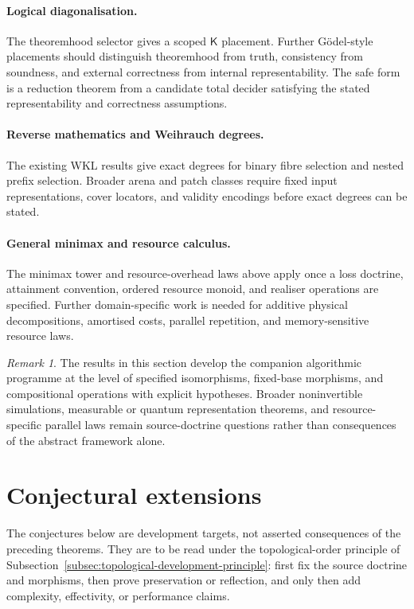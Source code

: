 \documentclass[11pt]{article}
\theoremstyle{plain}
\theoremstyle{definition}
\theoremstyle{remark}
\newtheorem{remark}[theorem]{Remark}
\begin{document}
\paragraph{Logical diagonalisation.}
The theoremhood selector gives a scoped $\mathsf K$ placement. Further
Gödel-style placements should distinguish theoremhood from truth, consistency
from soundness, and external correctness from internal representability. The safe
form is a reduction theorem from a candidate total decider satisfying the stated
representability and correctness assumptions.

\paragraph{Reverse mathematics and Weihrauch degrees.}
The existing WKL results give exact degrees for binary fibre selection and nested
prefix selection. Broader arena and patch classes require fixed input
representations, cover locators, and validity encodings before exact degrees can
be stated.

\paragraph{General minimax and resource calculus.}
The minimax tower and resource-overhead laws above apply once a loss doctrine,
attainment convention, ordered resource monoid, and realiser operations are
specified. Further domain-specific work is needed for additive physical
decompositions, amortised costs, parallel repetition, and memory-sensitive
resource laws.

\begin{remark}
The results in this section develop the companion algorithmic programme at
the level of specified isomorphisms, fixed-base morphisms, and compositional operations with
explicit hypotheses. Broader noninvertible simulations, measurable or quantum
representation theorems, and resource-specific parallel laws remain
source-doctrine questions rather than consequences of the abstract framework
alone.
\end{remark}

\section{Conjectural extensions}\label{sec:conjectures}

The conjectures below are development targets, not asserted consequences of the
preceding theorems. They are to be read under the topological-order principle of
Subsection~\ref{subsec:topological-development-principle}: first fix the source
doctrine and morphisms, then prove preservation or reflection, and only then add
complexity, effectivity, or performance claims.
\end{document}
